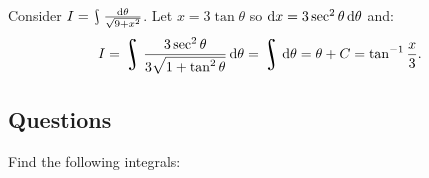 \begin{ex}
  Consider $ I = \rint \frac{\dif{\theta}}{\sqrt{9 + x^2}} $. Let $ x = 3\tan\theta $ so $ \dif{x} = 3\sec^2\theta \dif{\theta} $ and:
  \begin{displaymath}
    I = \rint \frac{3\sec^2 \theta}{3\sqrt{1 + \tan^2 \theta}} \dif{\theta} = \rint \dif{\theta} = \theta + C = \tan^{-1} \frac{x}{3}.
  \end{displaymath}
\end{ex}

\clearpage
\subsection*{Questions}
\begin{questions}
  \questioS Find the following integrals:
\end{questions}

